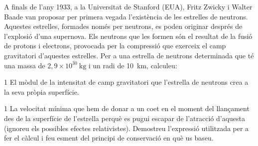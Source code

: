 A finals de l'any 1933, a la Universitat de Stanford (EUA), Fritz Zwicky i Walter Baade van proposar per primera vegada l'existència de les estrelles de neutrons. Aquestes estrelles, formades només per neutrons, es poden originar després de l'explosió d'una supernova. Els neutrons que les formen són el resultat de la fusió de protons i electrons, provocada per la compressió que exerceix el camp gravitatori d'aquestes estrelles. Per a una estrella de neutrons determinada que té una massa de $2,9\times 10^{30}\ \mathrm{kg}$ i un radi de 10~km, calculeu:


\begin{apartat}{1}
El mòdul de la intensitat de camp gravitatori que l'estrella de neutrons crea a la seva pròpia superfície.
\end{apartat}

\begin{apartat}{1}
La velocitat mínima que hem de donar a un coet en el moment del llançament des de la superfície de l'estrella perquè es pugui escapar de l'atracció d'aquesta (ignoreu els possibles efectes relativistes). Demostreu l'expressió utilitzada per a fer el càlcul i feu esment del principi de conservació en què us baseu.
\end{apartat}

